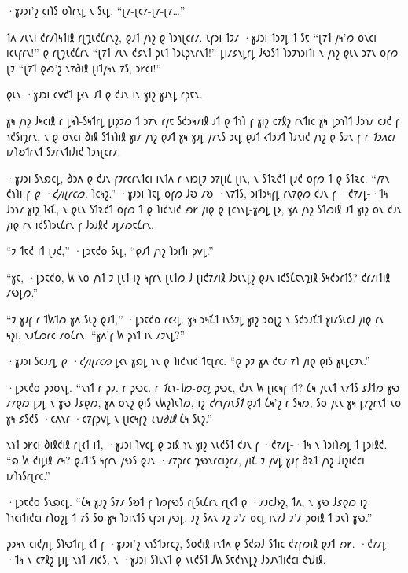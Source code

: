 
·𐑣𐑨𐑮𐑦'𐑟 𐑤𐑦𐑐𐑕 𐑴𐑐𐑩𐑯𐑛 𐑯 𐑕𐑧𐑛, “𐑚𐑳-𐑚𐑤𐑳-𐑚𐑳-𐑚𐑳…”

𐑑𐑵 𐑥𐑧𐑯𐑦 𐑒𐑩𐑥𐑐𐑰𐑑𐑦𐑙 𐑩𐑚𐑡𐑧𐑒𐑖𐑩𐑯𐑟, 𐑞𐑨𐑑 𐑢𐑪𐑟 𐑞 𐑐𐑮𐑪𐑚𐑤𐑩𐑥. 𐑧𐑝𐑮𐑦 𐑑𐑲𐑥 ·𐑣𐑨𐑮𐑦 𐑑𐑮𐑲𐑛 𐑑 𐑕𐑱 “𐑚𐑳𐑑 𐑢𐑰'𐑼 𐑴𐑯𐑤𐑦 𐑦𐑤𐑧𐑝𐑩𐑯!” 𐑞 𐑩𐑚𐑡𐑧𐑒𐑖𐑩𐑯 “𐑚𐑳𐑑 𐑥𐑧𐑯 𐑒𐑭𐑯𐑑 𐑜𐑧𐑑 𐑐𐑮𐑧𐑜𐑯𐑩𐑯𐑑!” 𐑛𐑦𐑥𐑭𐑯𐑛𐑩𐑛 𐑓𐑻𐑕𐑑 𐑐𐑮𐑲𐑪𐑮𐑦𐑑𐑦 𐑯 𐑢𐑪𐑟 𐑞𐑧𐑯 𐑮𐑳𐑯 𐑴𐑝𐑼 𐑚𐑲 “𐑚𐑳𐑑 𐑞𐑺'𐑟 𐑯𐑳𐑔𐑦𐑙 𐑚𐑦𐑑𐑢𐑰𐑯 𐑳𐑕, 𐑮𐑾𐑤𐑦!”

𐑞𐑧𐑯 ·𐑣𐑨𐑮𐑦 𐑤𐑫𐑒𐑑 𐑛𐑬𐑯 𐑨𐑑 𐑞 𐑒𐑨𐑯 𐑦𐑯 𐑣𐑦𐑟 𐑣𐑨𐑯𐑛 𐑩𐑜𐑱𐑯.

𐑣𐑰 𐑢𐑪𐑟 𐑓𐑰𐑤𐑦𐑙 𐑩 𐑛𐑰𐑐-𐑕𐑰𐑑𐑩𐑛 𐑛𐑦𐑟𐑲𐑼 𐑑 𐑮𐑳𐑯 𐑩𐑢𐑱 𐑕𐑒𐑮𐑰𐑥𐑦𐑙 𐑨𐑑 𐑞 𐑑𐑪𐑐 𐑝 𐑣𐑦𐑟 𐑤𐑳𐑙𐑟 𐑩𐑯𐑑𐑦𐑤 𐑣𐑰 𐑛𐑮𐑪𐑐𐑑 𐑓𐑮𐑪𐑥 𐑤𐑨𐑒 𐑝 𐑪𐑒𐑕𐑦𐑡𐑩𐑯, 𐑯 𐑞 𐑴𐑯𐑤𐑦 𐑔𐑦𐑙 𐑕𐑑𐑪𐑐𐑦𐑙 𐑣𐑦𐑥 𐑢𐑪𐑟 𐑞𐑨𐑑 𐑣𐑰 𐑣𐑨𐑛 𐑢𐑳𐑯𐑕 𐑮𐑧𐑛 𐑞𐑨𐑑 𐑬𐑑𐑮𐑲𐑑 𐑐𐑨𐑯𐑦𐑒 𐑢𐑪𐑟 𐑞 𐑕𐑲𐑯 𐑝 𐑩 \emph{𐑑𐑮𐑵𐑤𐑦} 𐑦𐑥𐑐𐑹𐑑𐑩𐑯𐑑 𐑕𐑲𐑩𐑯𐑑𐑦𐑓𐑦𐑒 𐑐𐑮𐑪𐑚𐑤𐑩𐑥.

·𐑣𐑨𐑮𐑦 𐑕𐑯𐑸𐑤𐑛, 𐑔𐑮𐑵 𐑞 𐑒𐑨𐑯 𐑝𐑲𐑩𐑤𐑩𐑯𐑑𐑤𐑦 𐑦𐑯𐑑𐑵 𐑩 𐑯𐑽𐑚𐑲 𐑮𐑳𐑚𐑦𐑖 𐑚𐑦𐑯, 𐑯 𐑕𐑑𐑷𐑒𐑑 𐑚𐑨𐑒 𐑴𐑝𐑼 𐑑 𐑞 𐑕𐑑𐑷𐑤. “𐑢𐑳𐑯 𐑒𐑪𐑐𐑦 𐑝 \emph{𐑞 ·𐑒𐑢𐑦𐑚𐑩𐑤𐑼,} 𐑐𐑤𐑰𐑟.” ·𐑣𐑨𐑮𐑦 𐑐𐑱𐑛 𐑴𐑝𐑼 𐑓𐑹 𐑥𐑹 ·𐑯𐑳𐑑𐑕, 𐑮𐑦𐑑𐑮𐑰𐑝𐑛 𐑩𐑯𐑳𐑞𐑼 𐑒𐑨𐑯 𐑝 ·𐑒𐑳𐑥𐑛-·𐑑𐑰 𐑓𐑮𐑪𐑥 𐑣𐑦𐑟 𐑐𐑬𐑗, 𐑯 𐑞𐑧𐑯 𐑕𐑑𐑷𐑒𐑑 𐑴𐑝𐑼 𐑑 𐑞 𐑐𐑦𐑒𐑯𐑦𐑒 𐑺𐑾 𐑢𐑦𐑞 𐑞 𐑚𐑤𐑪𐑯𐑛-𐑣𐑺𐑛 𐑚𐑶, 𐑣𐑵 𐑢𐑪𐑟 𐑕𐑑𐑺𐑦𐑙 𐑨𐑑 𐑣𐑦𐑟 𐑴𐑯 𐑒𐑨𐑯 𐑢𐑦𐑞 𐑩𐑯 𐑦𐑒𐑕𐑐𐑮𐑧𐑖𐑩𐑯 𐑝 𐑓𐑮𐑨𐑙𐑒 𐑨𐑛𐑥𐑼𐑱𐑖𐑩𐑯.

“𐑲 𐑑𐑱𐑒 𐑦𐑑 𐑚𐑨𐑒,” ·𐑛𐑮𐑱𐑒𐑴 𐑕𐑧𐑛, “𐑞𐑨𐑑 𐑢𐑪𐑟 𐑐𐑮𐑦𐑑𐑦 𐑜𐑫𐑛.”

“𐑣𐑱, ·𐑛𐑮𐑱𐑒𐑴, 𐑿 𐑯𐑴 𐑢𐑪𐑑 𐑲 𐑚𐑧𐑑 𐑦𐑟 𐑰𐑝𐑩𐑯 𐑚𐑧𐑑𐑼 𐑓 𐑚𐑦𐑒𐑳𐑥𐑦𐑙 𐑓𐑮𐑧𐑯𐑛𐑟 𐑞𐑨𐑯 𐑦𐑒𐑕𐑗𐑱𐑯𐑡𐑦𐑙 𐑕𐑰𐑒𐑮𐑩𐑑𐑕? 𐑒𐑩𐑥𐑦𐑑𐑦𐑙 𐑥𐑻𐑛𐑼.”

“𐑲 𐑣𐑨𐑝 𐑩 𐑑𐑿𐑑𐑼 𐑣𐑵 𐑕𐑧𐑟 𐑞𐑨𐑑,” ·𐑛𐑮𐑱𐑒𐑴 𐑩𐑤𐑬𐑛. 𐑣𐑰 𐑮𐑰𐑗𐑑 𐑦𐑯𐑕𐑲𐑛 𐑣𐑦𐑟 𐑮𐑴𐑚𐑟 𐑯 𐑕𐑒𐑮𐑨𐑗𐑑 𐑣𐑦𐑥𐑕𐑧𐑤𐑓 𐑢𐑦𐑞 𐑩𐑯 𐑰𐑟𐑦, 𐑯𐑨𐑗𐑼𐑩𐑤 𐑥𐑴𐑖𐑩𐑯. “𐑣𐑵'𐑝 𐑿 𐑜𐑪𐑑 𐑦𐑯 𐑥𐑲𐑯𐑛?”

·𐑣𐑨𐑮𐑦 𐑕𐑤𐑨𐑥𐑛 \emph{𐑞 ·𐑒𐑢𐑦𐑚𐑩𐑤𐑼} 𐑛𐑬𐑯 𐑣𐑸𐑛 𐑪𐑯 𐑞 𐑐𐑦𐑒𐑯𐑦𐑒 𐑑𐑱𐑚𐑩𐑤. “𐑞 𐑜𐑲 𐑣𐑵 𐑒𐑱𐑥 𐑳𐑐 𐑢𐑦𐑞 𐑞𐑦𐑕 𐑣𐑧𐑛𐑤𐑲𐑯.”

·𐑛𐑮𐑱𐑒𐑴 𐑜𐑮𐑴𐑯𐑛. “𐑯𐑪𐑑 𐑩 𐑜𐑲. 𐑩 𐑜𐑻𐑤. 𐑩 \emph{𐑑𐑧𐑯-𐑘𐑽-𐑴𐑤𐑛} 𐑜𐑻𐑤, 𐑒𐑨𐑯 𐑿 𐑚𐑦𐑤𐑰𐑝 𐑦𐑑? 𐑖𐑰 𐑢𐑧𐑯𐑑 𐑯𐑳𐑑𐑕 𐑭𐑓𐑑𐑼 𐑣𐑻 𐑥𐑳𐑞𐑼 𐑛𐑲𐑛 𐑯 𐑣𐑻 𐑓𐑭𐑞𐑼, 𐑣𐑵 𐑴𐑯𐑟 𐑞𐑦𐑕 𐑯𐑿𐑟𐑐𐑱𐑐𐑼, 𐑦𐑟 \emph{𐑒𐑩𐑯𐑝𐑦𐑯𐑕𐑑} 𐑞𐑨𐑑 𐑖𐑰'𐑟 𐑩 𐑕𐑰𐑼, 𐑕𐑴 𐑢𐑧𐑯 𐑣𐑰 𐑛𐑳𐑟𐑩𐑯𐑑 𐑯𐑴 𐑣𐑰 𐑭𐑕𐑒𐑕 ·𐑤𐑵𐑯𐑩 ·𐑤𐑳𐑝𐑜𐑫𐑛 𐑯 𐑚𐑦𐑤𐑰𐑝𐑟 \emph{𐑧𐑯𐑦𐑔𐑦𐑙} 𐑖𐑰 𐑕𐑧𐑟.”

𐑯𐑪𐑑 𐑮𐑾𐑤𐑦 𐑔𐑦𐑙𐑒𐑦𐑙 𐑩𐑚𐑬𐑑 𐑦𐑑, ·𐑣𐑨𐑮𐑦 𐑐𐑫𐑤𐑛 𐑞 𐑮𐑦𐑙 𐑪𐑯 𐑣𐑦𐑟 𐑯𐑧𐑒𐑕𐑑 𐑒𐑨𐑯 𐑝 ·𐑒𐑳𐑥𐑛-·𐑑𐑰 𐑯 𐑐𐑮𐑦𐑐𐑺𐑛 𐑑 𐑛𐑮𐑦𐑙𐑒. “𐑸 𐑿 𐑒𐑦𐑛𐑦𐑙 𐑥𐑰? 𐑞𐑨𐑑'𐑕 𐑰𐑝𐑩𐑯 𐑢𐑻𐑕 𐑞𐑨𐑯 ·𐑥𐑳𐑜𐑩𐑤 𐑡𐑻𐑯𐑩𐑤𐑦𐑟𐑩𐑥, 𐑢𐑦𐑗 𐑲 𐑢𐑫𐑛 𐑣𐑨𐑝 𐑔𐑷𐑑 𐑢𐑪𐑟 𐑓𐑦𐑟𐑦𐑒𐑤𐑦 𐑦𐑥𐑐𐑪𐑕𐑩𐑚𐑩𐑤.”

·𐑛𐑮𐑱𐑒𐑴 𐑕𐑯𐑸𐑤𐑛. “𐑖𐑰 𐑣𐑨𐑟 𐑕𐑳𐑥 𐑕𐑹𐑑 𐑝 𐑐𐑼𐑝𐑻𐑕 𐑩𐑚𐑕𐑧𐑖𐑩𐑯 𐑩𐑚𐑬𐑑 𐑞 ·𐑥𐑨𐑤𐑓𐑶𐑟, 𐑑𐑵, 𐑯 𐑣𐑻 𐑓𐑭𐑞𐑼 𐑦𐑟 𐑐𐑪𐑤𐑦𐑑𐑦𐑒𐑤𐑦 𐑩𐑐𐑴𐑟𐑛 𐑑 𐑳𐑕 𐑕𐑴 𐑣𐑰 𐑐𐑮𐑦𐑯𐑑𐑕 𐑧𐑝𐑮𐑦 𐑢𐑻𐑛. 𐑨𐑟 𐑕𐑵𐑯 𐑨𐑟 𐑲'𐑥 𐑴𐑤𐑛 𐑦𐑯𐑳𐑓 𐑲'𐑥 𐑜𐑴𐑦𐑙 𐑑 𐑮𐑱𐑐 𐑣𐑻.”

𐑜𐑮𐑰𐑯 𐑤𐑦𐑒𐑢𐑦𐑛 𐑕𐑐𐑻𐑑𐑩𐑛 𐑬𐑑 𐑝 ·𐑣𐑨𐑮𐑦'𐑟 𐑯𐑪𐑕𐑑𐑮𐑩𐑤𐑟, 𐑕𐑴𐑒𐑦𐑙 𐑦𐑯𐑑𐑵 𐑞 𐑕𐑒𐑸𐑓 𐑕𐑑𐑦𐑤 𐑒𐑳𐑝𐑼𐑦𐑙 𐑞𐑨𐑑 𐑺𐑾. ·𐑒𐑳𐑥𐑛-·𐑑𐑰 𐑯 𐑤𐑳𐑙𐑟 𐑛𐑦𐑛 𐑯𐑪𐑑 𐑥𐑦𐑒𐑕, 𐑯 ·𐑣𐑨𐑮𐑦 𐑕𐑐𐑧𐑯𐑑 𐑞 𐑯𐑧𐑒𐑕𐑑 𐑓𐑿 𐑕𐑱𐑒𐑪𐑯𐑛𐑟 𐑓𐑮𐑨𐑯𐑑𐑦𐑒𐑤𐑦 𐑒𐑪𐑓𐑦𐑙.

